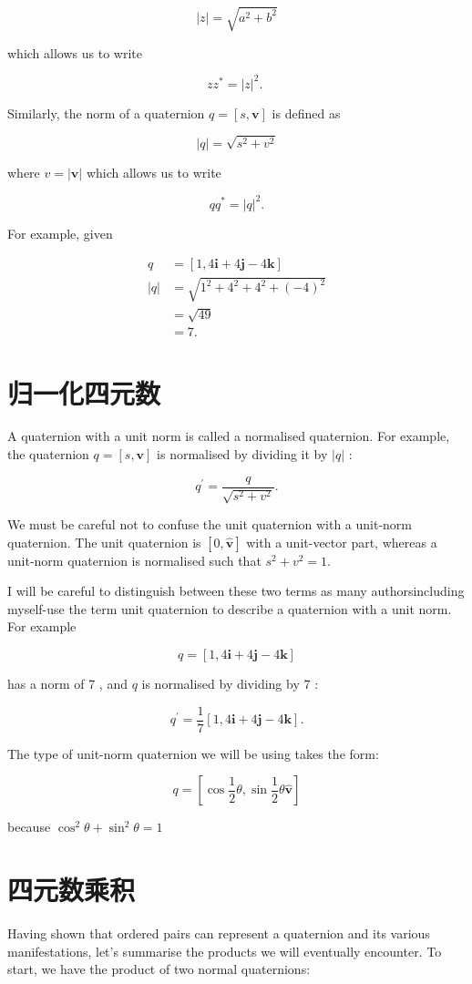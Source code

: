 $$
|z|=\sqrt{a^{2}+b^{2}}
$$

which allows us to write

$$
z z^{*}=|z|^{2} \text {. }
$$

Similarly, the norm of a quaternion $q=[s, \mathbf{v}]$ is defined as

$$
|q|=\sqrt{s^{2}+v^{2}}
$$

where $v=|\mathbf{v}|$ which allows us to write

$$
q q^{*}=|q|^{2} .
$$

For example, given

$$
\begin{aligned}
q & =[1,4 \mathbf{i}+4 \mathbf{j}-4 \mathbf{k}] \\
|q| & =\sqrt{1^{2}+4^{2}+4^{2}+(-4)^{2}} \\
& =\sqrt{49} \\
& =7 .
\end{aligned}
$$

\section{归一化四元数}
A quaternion with a unit norm is called a normalised quaternion. For example, the quaternion $q=[s, \mathbf{v}]$ is normalised by dividing it by $|q|$ :

$$
q^{\prime}=\frac{q}{\sqrt{s^{2}+v^{2}}} .
$$

We must be careful not to confuse the unit quaternion with a unit-norm quaternion. The unit quaternion is $[0, \hat{\mathbf{v}}]$ with a unit-vector part, whereas a unit-norm quaternion is normalised such that $s^{2}+v^{2}=1$.

I will be careful to distinguish between these two terms as many authorsincluding myself-use the term unit quaternion to describe a quaternion with a unit norm. For example

$$
q=[1,4 \mathbf{i}+4 \mathbf{j}-4 \mathbf{k}]
$$

has a norm of 7 , and $q$ is normalised by dividing by 7 :

$$
q^{\prime}=\frac{1}{7}[1,4 \mathbf{i}+4 \mathbf{j}-4 \mathbf{k}] .
$$

The type of unit-norm quaternion we will be using takes the form:

$$
q=\left[\cos \frac{1}{2} \theta, \sin \frac{1}{2} \theta \hat{\mathbf{v}}\right]
$$

because $\cos ^{2} \theta+\sin ^{2} \theta=1$

\section{四元数乘积}
Having shown that ordered pairs can represent a quaternion and its various manifestations, let's summarise the products we will eventually encounter. To start, we have the product of two normal quaternions:

